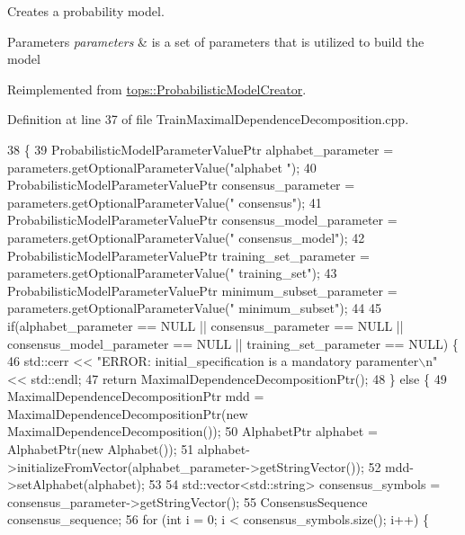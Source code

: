 Creates a probability model. 


\begin{DoxyParams}{Parameters}
{\em parameters} & is a set of parameters that is utilized to build the model \\
\hline
\end{DoxyParams}


Reimplemented from \hyperlink{classtops_1_1ProbabilisticModelCreator_afed6c8ffa45fff446bdaa8b533da8f7c}{tops\+::\+Probabilistic\+Model\+Creator}.



Definition at line 37 of file Train\+Maximal\+Dependence\+Decomposition.\+cpp.


\begin{DoxyCode}
38   \{
39     ProbabilisticModelParameterValuePtr alphabet\_parameter = parameters.getOptionalParameterValue(\textcolor{stringliteral}{"alphabet
      "});
40     ProbabilisticModelParameterValuePtr consensus\_parameter = parameters.getOptionalParameterValue(\textcolor{stringliteral}{"
      consensus"});
41     ProbabilisticModelParameterValuePtr consensus\_model\_parameter = parameters.getOptionalParameterValue(\textcolor{stringliteral}{"
      consensus\_model"});
42     ProbabilisticModelParameterValuePtr training\_set\_parameter = parameters.getOptionalParameterValue(\textcolor{stringliteral}{"
      training\_set"});
43     ProbabilisticModelParameterValuePtr minimum\_subset\_parameter = parameters.getOptionalParameterValue(\textcolor{stringliteral}{"
      minimum\_subset"});
44 
45     \textcolor{keywordflow}{if}(alphabet\_parameter == NULL || consensus\_parameter == NULL || consensus\_model\_parameter == NULL || 
      training\_set\_parameter == NULL) \{
46       std::cerr << \textcolor{stringliteral}{"ERROR: initial\_specification is a mandatory paramenter\(\backslash\)n"} << std::endl;
47       \textcolor{keywordflow}{return} MaximalDependenceDecompositionPtr();
48     \} \textcolor{keywordflow}{else} \{
49       MaximalDependenceDecompositionPtr mdd = MaximalDependenceDecompositionPtr(\textcolor{keyword}{new} 
      MaximalDependenceDecomposition());
50       AlphabetPtr alphabet = AlphabetPtr(\textcolor{keyword}{new} Alphabet());
51       alphabet->initializeFromVector(alphabet\_parameter->getStringVector());
52       mdd->setAlphabet(alphabet);
53 
54       std::vector<std::string> consensus\_symbols = consensus\_parameter->getStringVector();
55       ConsensusSequence consensus\_sequence;
56       \textcolor{keywordflow}{for} (\textcolor{keywordtype}{int} i = 0; i < consensus\_symbols.size(); i++) \{

\end{DoxyCode}
